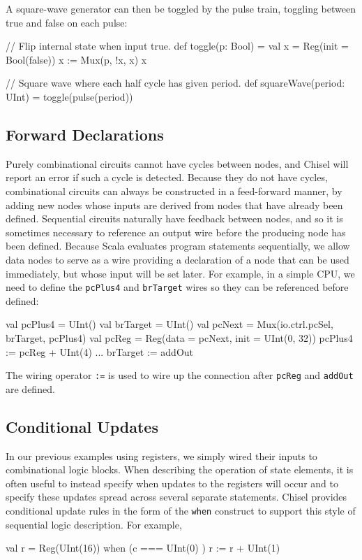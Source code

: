 \documentclass[twocolumn,10pt]{article}
\def\code#1{{\tt #1}}
\begin{document}
\noindent
A square-wave generator can then be toggled by the pulse train,
toggling between true and false on each pulse:
\begin{scala}
// Flip internal state when input true.
def toggle(p: Bool) = {
  val x = Reg(init = Bool(false))
  x := Mux(p, !x, x)
  x
}

// Square wave where each half cycle has given period.
def squareWave(period: UInt) = toggle(pulse(period))
\end{scala}

\subsection{Forward Declarations}

Purely combinational circuits cannot have cycles between nodes, and
Chisel will report an error if such a cycle is detected.  Because they
do not have cycles, combinational circuits can always be constructed
in a feed-forward manner, by adding new nodes whose inputs are derived
from nodes that have already been defined.  Sequential circuits
naturally have feedback between nodes, and so it is sometimes
necessary to reference an output wire before the producing node has
been defined.  Because Scala evaluates program statements
sequentially, we allow data nodes to serve as a wire providing
a declaration of a node that can be used immediately, but whose
input will be set later.  
For example, in a simple CPU, we need to define the \verb!pcPlus4!
and \verb!brTarget! wires so they can be referenced before defined:
\begin{scala}
val pcPlus4  = UInt()
val brTarget = UInt()
val pcNext   = Mux(io.ctrl.pcSel, brTarget, pcPlus4)
val pcReg    = Reg(data = pcNext, init = UInt(0, 32))
pcPlus4     := pcReg + UInt(4)
...
brTarget    := addOut
\end{scala}

\noindent
The wiring operator
\verb!:=! is used to wire up
the connection after \verb!pcReg! and \verb!addOut! are defined.

\subsection{Conditional Updates}

In our previous examples using registers, we simply wired their inputs
to combinational logic blocks.  When describing the operation of state
elements, it is often useful to instead specify when updates to the
registers will occur and to specify these updates spread across
several separate statements.  Chisel provides conditional update rules
in the form of the \code{when} construct to support this style of
sequential logic description. For example,
\begin{scala}
val r = Reg(UInt(16))
when (c === UInt(0) ) {
  r := r + UInt(1)
}
\end{scala}
\end{document}
